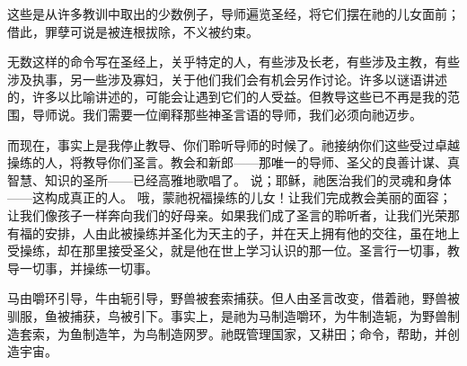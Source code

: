 \par

 \par

 \par

 \par

这些是从许多教训中取出的少数例子，导师遍览圣经，将它们摆在祂的儿女面前；借此，罪孽可说是被连根拔除，不义被约束。\par

无数这样的命令写在圣经上，关乎特定的人，有些涉及长老，有些涉及主教，有些涉及执事，另一些涉及寡妇，关于他们我们会有机会另作讨论。许多以谜语讲述的，许多以比喻讲述的，可能会让遇到它们的人受益。但教导这些已不再是我的范围，导师说。我们需要一位阐释那些神圣言语的导师，我们必须向祂迈步。\par

而现在，事实上是我停止教导、你们聆听导师的时候了。祂接纳你们这些受过卓越操练的人，将教导你们圣言。教会和新郎——那唯一的导师、圣父的良善计谋、真智慧、知识的圣所——已经高雅地歌唱了。 说；耶稣，祂医治我们的灵魂和身体——这构成真正的人。  哦，蒙祂祝福操练的儿女！让我们完成教会美丽的面容；让我们像孩子一样奔向我们的好母亲。如果我们成了圣言的聆听者，让我们光荣那有福的安排，人由此被操练并圣化为天主的子，并在天上拥有他的交往，虽在地上受操练，却在那里接受圣父，就是他在世上学习认识的那一位。圣言行一切事，教导一切事，并操练一切事。\par

马由嚼环引导，牛由轭引导，野兽被套索捕获。但人由圣言改变，借着祂，野兽被驯服，鱼被捕获，鸟被引下。事实上，是祂为马制造嚼环，为牛制造轭，为野兽制造套索，为鱼制造竿，为鸟制造网罗。祂既管理国家，又耕田；命令，帮助，并创造宇宙。\par

